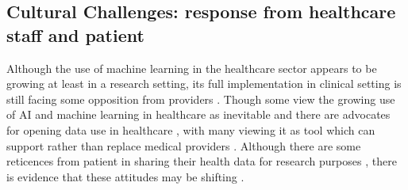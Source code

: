 \subsection{Cultural Challenges: response from healthcare staff and patient}
Although the use of machine learning in the healthcare sector appears to be growing at least in a research setting, its full implementation in clinical setting is still facing some opposition from providers \citep{Cabitza:2017hv}. Though some view the growing use of AI and machine learning in healthcare as inevitable \citep{Murdoch:2013hm} and there are advocates for opening data use in healthcare \citep{Kostkova:2016ur}, with many viewing it as tool which can support rather than replace medical providers \citep{Pesapane:2018kv}.
Although there are some reticences from patient in sharing their health data for research purposes \citep{Goldacre:tf}, there is evidence that these attitudes may be shifting \citep{Kostkova:2016ur}. 

